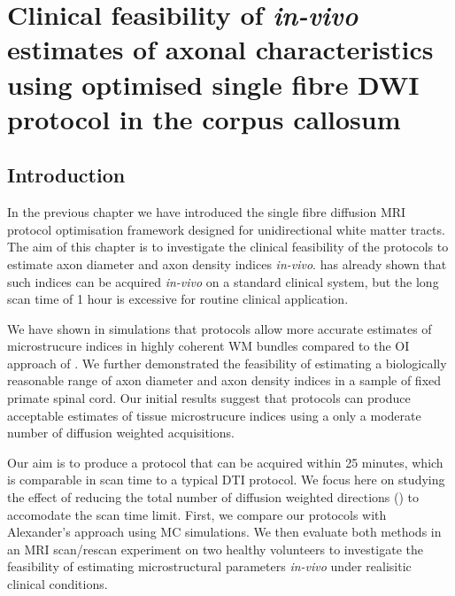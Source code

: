 \chapter{Clinical feasibility of \textit{in-vivo} estimates of axonal characteristics using optimised single fibre DWI protocol in the corpus callosum}
\label{chapter8}
\section{Introduction}
In the previous chapter we have introduced the single fibre \SF{} diffusion MRI protocol optimisation framework designed for unidirectional white matter tracts. The aim of this chapter is to investigate the clinical feasibility of the \SF{} protocols to estimate axon diameter and axon density indices \emph{in-vivo}.  has already shown that such indices can be acquired \emph{in-vivo} on a standard clinical system, but the long scan time of 1 hour is excessive for routine clinical application.  


We have shown in simulations that \SF{} protocols allow more accurate estimates of microstrucure indices in highly coherent WM bundles compared to the \gls{OI} approach of \citet{Alexander:2008}. We further demonstrated the feasibility of estimating a biologically reasonable range of axon diameter and axon density indices in a sample of fixed primate spinal cord. Our initial results suggest that \SF{} protocols can produce acceptable estimates of tissue microstrucure indices using a only a moderate number of diffusion weighted acquisitions. 

Our aim is to produce a \SF{} protocol that can be acquired within 25 minutes, which is comparable in scan time to a typical DTI protocol. We focus here on studying the effect of reducing the total number of diffusion weighted directions (\SF{}) to accomodate the scan time limit. First, we compare our \SF{} protocols with Alexander's \OI{} approach using \gls{MC} simulations. We then evaluate both methods in an MRI scan/rescan experiment on two healthy volunteers to investigate the feasibility of estimating microstructural parameters \emph{in-vivo} under realisitic clinical conditions.

